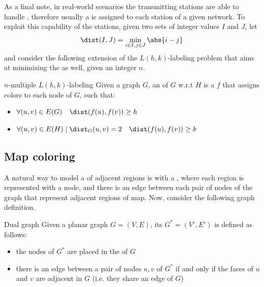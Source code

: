 \documentclass[a4paper, 12pt]{report}
\begin{document}
    As a final note, in real-world scenarios the transmitting stations are able to handle , therefore usually a  is assigned to each station of a given network. To exploit this capability of the stations, given two sets of integer values $I$ and $J$, let $$\dist(I, J) = \min_{i \in I, j \in J}{\abs{i - j}}$$ and consider the following extension of the $L(h, k)$-labeling problem that aims at minimizing the  as well, given an integer $n$.

    \begin{frameddefn}{$n$-multiple $L(h,k)$-labeling}
        Given a graph $G$, an  of $G$ w.r.t $H$ is a  $f$ that assigns  colors to each node of $G$, such that:

        \begin{itemize}
            \item $\forall (u, v) \in E(G) \quad \dist(f(u), f(v)) \ge h$
            \item $\forall (u, v) \in E(H) \mid \dist_G(u, v) = 2 \quad \dist(f(u), f(v)) \ge k$
        \end{itemize}
    \end{frameddefn}

    \subsection{Map coloring}

    A natural way to model a  of adjacent regions is with a , where each region is represented with a node, and there is an edge between each pair of nodes of the graph that represent adjacent regions of map. Now, consider the following graph definition.

    \begin{frameddefn}{Dual graph}
        Given a planar graph $G = (V, E)$, its  $G^* = (V', E')$ is defined as follows:

        \begin{itemize}
            \item the nodes of $G^*$ are placed in the  of $G$
            \item there is an edge between a pair of nodes $u, v$ of $G^*$ if and only if the faces of $u$ and $v$ are adjacent in $G$ (i.e. they share an edge of $G$)
        \end{itemize}
    \end{frameddefn}
\end{document}
